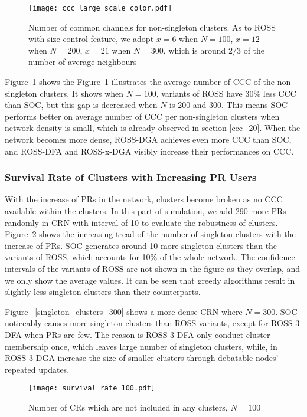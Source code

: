 \begin{figure}[ht!]
  \centering
  \texttt{[image: ccc\_large\_scale\_color.pdf]}
  \caption{Number of common channels for non-singleton clusters. As to ROSS with size control feature, we adopt $x=6$ when $N=100$, $x=12$ when $N=200$, $x=21$ when $N=300$, which is around $2/3$ of the number of average neighbours}
  \label{ccc_large_scale}
\end{figure}
Figure~\ref{ccc_large_scale} shows the 
Figure~\ref{ccc_large_scale} illustrates the average number of CCC of the non-singleton clusters.
It shows when $N=100$, variants of ROSS have 30\% less CCC than SOC, but this gap is decreased when $N$ is 200 and 300.
This means SOC performs better on average number of CCC per non-singleton clusters when network density is small, which is already observed in section \ref{ccc_20}.
When the network becomes more dense, ROSS-DGA achieves even more CCC than SOC, and ROSS-DFA and ROSS-x-DGA visibly increase their performances on CCC.



\subsubsection{Survival Rate of Clusters with Increasing PR Users}
With the increase of PRs in the network, clusters become broken as no CCC available within the clusters.
In this part of simulation, we add 290 more PRs randomly in CRN with interval of 10 to evaluate the robustness of clusters.
Figure~\ref{singleton_clusters_100} shows the increasing tread of the number of singleton clusters with the increase of PRs.
SOC generates around 10 more singleton clusters than the variants of ROSS, which accounts for 10\% of the whole network.
The confidence intervals of the variants of ROSS are not shown in the figure as they overlap, and we only show the average values.
It can be seen that greedy algorithms result in slightly less singleton clusters than their counterparts.

Figure ~\ref{singleton_clusters_300} shows a more dense CRN where $N=300$.
SOC noticeably causes more singleton clusters than ROSS variants, except for ROSS-3-DFA when PRs are few.
The reason is ROSS-3-DFA only conduct cluster membership once, which leaves large number of singleton clusters, while, in ROSS-3-DGA increase the size of smaller clusters through debatable nodes' repeated updates.

\begin{figure}[h!]
  \centering
  \texttt{[image: survival\_rate\_100.pdf]}
  \caption{Number of CRs which are not included in any clusters, $N=100$}
  \label{singleton_clusters_100}
\end{figure}


